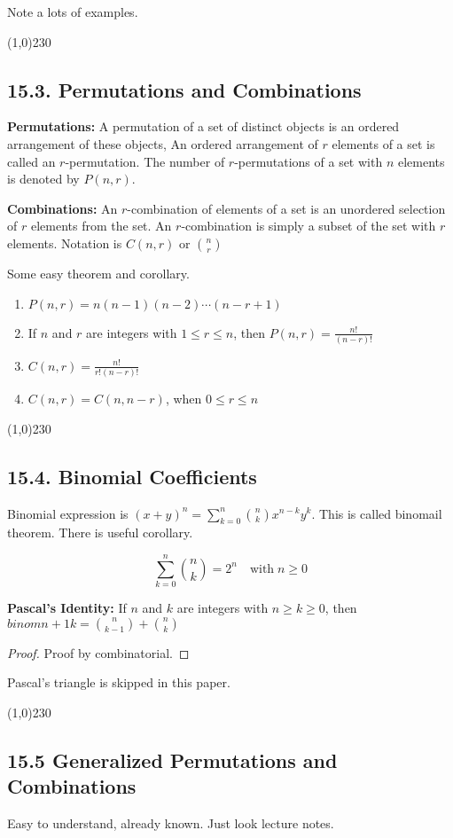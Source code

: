 Note a lots of examples.

\begin{center}
\line(1,0){230}
\end{center}

\subsection*{15.3. Permutations and Combinations}

\begin{definition}
    \textbf{Permutations: } A permutation of a set of distinct objects is an ordered arrangement of these objects, An ordered arrangement of $r$ elements of a set is called an $r$-permutation. The number of $r$-permutations of a set with $n$ elements is denoted by $P(n,r)$.
\end{definition}
\begin{definition}
    \textbf{Combinations: } An $r$-combination of elements of a set is an unordered selection of $r$ elements from the set. An $r$-combination is simply a subset of the set with $r$ elements. Notation is $C(n, r)$ or $\binom n r$
\end{definition}

Some easy theorem and corollary.
\begin{enumerate}
    \item $P(n, r) = n(n-1)(n-2)\cdots(n-r+1)$
    \item If $n$ and $r$ are integers with $1 \le r \le n$, then $P(n, r) = \frac{n!}{(n-r)!}$
    \item $C(n, r) = \frac{n!}{r!(n-r)!}$
    \item $C(n, r) = C(n, n-r)$, when $0 \le r \le n$
\end{enumerate}

\begin{center}
\line(1,0){230}
\end{center}

\subsection*{15.4. Binomial Coefficients}

Binomial expression is $(x+y)^n = \sum_{k=0}^n \binom n k x^{n-k}y^k$. This is called binomail theorem. There is useful corollary.

\begin{corollary}
    $$\sum_{k=0}^n \binom n k = 2^n \quad \text{with} \; n \ge 0$$
\end{corollary}
\begin{theorem}
    \textbf{Pascal's Identity: } If $n$ and $k$ are integers with $n\ge k\ge0$, then $binom {n+1} k = \binom n {k-1} + \binom n k$
\end{theorem}
\begin{proof}
    Proof by combinatorial.
\end{proof}

Pascal's triangle is skipped in this paper.

\begin{center}
\line(1,0){230}
\end{center}

\subsection*{15.5 Generalized Permutations and Combinations}

Easy to understand, already known. Just look lecture notes.
